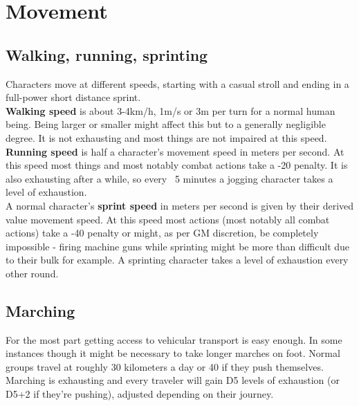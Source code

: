 \documentclass[12pt,a4paper,openany,usenames,dvipsnames]{book}
\begin{document}
	\pagebreak
	

	\chapter{Movement}
	\section{Walking, running, sprinting}
	Characters move at different speeds, starting with a casual stroll and ending in a full-power short distance sprint.\\
	\textbf{Walking speed} is about 3-4km/h, 1m/s or 3m per turn for a normal human being. Being larger or smaller might affect this but to a generally negligible degree. It is not exhausting and most things are not impaired at this speed.\\
	\textbf{Running speed} is half a character’s movement speed in meters per second. At this speed most things and most notably combat actions take a -20 penalty. It is also exhausting after a while, so every ~5 minutes a jogging character takes a level of exhaustion.\\
	A normal character’s \textbf{sprint speed} in meters per second is given by their derived value movement speed.
	At this speed most actions (most notably all combat actions)
		take a -40 penalty
		or might, as per GM discretion, be completely impossible
		- firing machine guns while sprinting might be more than difficult due to their bulk for example.
	A sprinting character takes a level of exhaustion every other round.
	\section{Marching}
	For the most part getting access to vehicular transport is easy enough. In some instances though it might be necessary to take longer marches on foot. Normal groups travel at roughly 30 kilometers a day or 40 if they push themselves. Marching is exhausting and every traveler will gain D5 levels of exhaustion (or D5+2 if they're pushing), adjusted depending on their journey.
\end{document}
